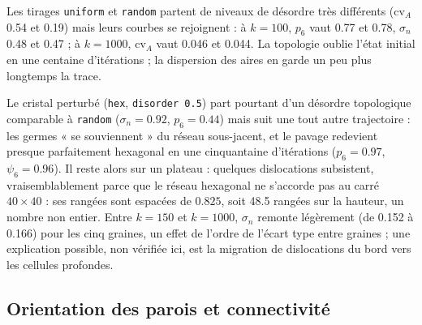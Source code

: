 \documentclass[10pt,a4paper]{article}
\newcommand{\code}[1]{\texttt{#1}}
\begin{document}
Les tirages \code{uniform} et \code{random} partent de niveaux de désordre très différents ($\mathrm{cv}_A$ 0.54
et 0.19) mais leurs courbes se rejoignent : à $k=100$, $p_6$ vaut 0.77 et 0.78, $\sigma_n$ 0.48 et 0.47 ; à
$k=1000$, $\mathrm{cv}_A$ vaut 0.046 et 0.044. La topologie oublie l'état initial en une centaine d'itérations ; la
dispersion des aires en garde un peu plus longtemps la trace.

Le cristal perturbé (\code{hex}, \code{disorder 0.5}) part pourtant d'un désordre topologique comparable à
\code{random} ($\sigma_n=0.92$, $p_6=0.44$) mais suit une tout autre trajectoire : les germes « se souviennent » du
réseau sous-jacent, et le pavage redevient presque parfaitement hexagonal en une cinquantaine d'itérations
($p_6=0.97$, $\psi_6=0.96$). Il reste alors sur un plateau : quelques dislocations subsistent, vraisemblablement
parce que le réseau hexagonal ne s'accorde pas au carré $40\times40$ : ses rangées sont espacées de $0.825$,
soit 48.5 rangées sur la hauteur, un nombre non entier. Entre $k=150$ et $k=1000$, $\sigma_n$ remonte légèrement (de 0.152 à 0.166) pour les cinq graines,
un effet de l'ordre de l'écart type entre graines ; une explication possible, non vérifiée ici, est la migration
de dislocations du bord vers les cellules profondes.

\subsection{Orientation des parois et connectivité}
\end{document}
